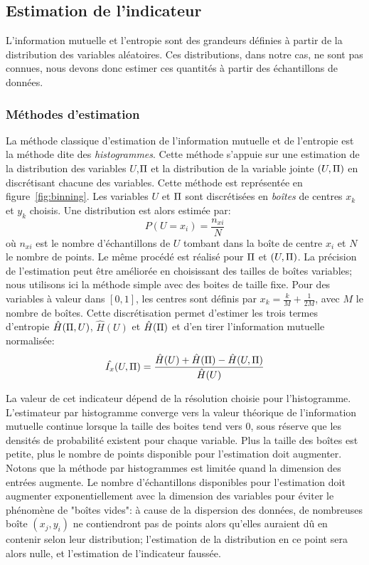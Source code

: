 \documentclass[../main]{subfiles}
\begin{document}
\subsection{Estimation de l'indicateur}

L'information mutuelle et l'entropie sont des grandeurs définies à partir de la distribution des variables aléatoires. Ces distributions, dans notre cas, ne sont pas connues, nous devons donc estimer ces quantités à partir des échantillons de données.

\subsubsection{Méthodes d'estimation}

La méthode classique d'estimation de l'information mutuelle et de l'entropie est la méthode dite des \emph{histogrammes}.
Cette méthode s'appuie sur une estimation de la distribution des variables $U$,$\Pi$ et la distribution de la variable jointe $(U,\Pi)$ en discrétisant chacune des variables.
Cette méthode est représentée en figure~\ref{fig:binning}. Les variables $U$ et $\Pi$ sont discrétisées en \emph{boîtes} de centres $x_k$ et $y_k$ choisis.
Une distribution est alors estimée par: 
$$P(U = x_i) = \frac{n_{xi}}{N} $$ où $n_{xi}$ est le nombre d'échantillons de $U$ tombant dans la boîte de centre $x_i$ et $N$ le nombre de points. Le même procédé est réalisé pour $\Pi$ et $(U,\Pi)$. La précision de l'estimation peut être améliorée en choisissant des tailles de boîtes variables; nous utilisons ici la méthode simple avec des boites de taille fixe.
Pour des variables à valeur dans $[0,1]$, les centres sont définis par $x_k = \frac{k}{M}+\frac{1}{2M}$, avec $M$ le nombre de boîtes.
Cette discrétisation permet d'estimer les trois termes d'entropie $\hat{H}(\Pi,U)$, $\hat{H}(U)$ et $\hat{H}(\Pi)$ et d'en tirer l'information mutuelle normalisée:
\begin{equation}
    \hat{I_x}(U,\Pi) = \frac{\hat{H}(U) + \hat{H}(\Pi) - \hat{H}(U,\Pi)}{\hat{H}(U)}
   \end{equation}

La valeur de cet indicateur dépend de la résolution choisie pour l'histogramme. L'estimateur  par histogramme converge vers la valeur théorique de l'information mutuelle continue lorsque la taille des boites tend vers 0, sous réserve que les densités de probabilité existent pour chaque variable. Plus la taille des boîtes est petite, plus le nombre de points disponible pour l'estimation doit augmenter.
Notons que la méthode par histogrammes est limitée quand la dimension des entrées augmente.
Le nombre d'échantillons disponibles pour l'estimation doit augmenter exponentiellement avec la dimension des variables pour éviter le phénomène de "boîtes vides": à cause de la dispersion des données, de nombreuses boîte $(x_j,y_i)$ ne contiendront pas de points alors qu'elles auraient dû en contenir selon leur distribution; l'estimation de la distribution en ce point sera alors nulle, et l'estimation de l'indicateur faussée.
\end{document}
